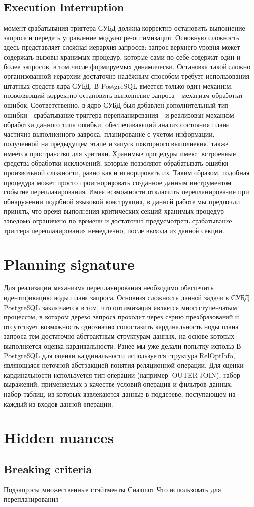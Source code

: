 \documentclass{article}
\begin{document}
\subsection{Execution Interruption}
 момент срабатывания триггера СУБД должна корректно остановить выполнение запроса и передать управление модулю ре-оптимизации. Основную сложность здесь представляет сложная иерархия запросов: запрос верхнего уровня может содержать вызовы хранимых процедур, которые сами по себе содержат один и более запросов, в том числе формируемых динамически. Остановка такой сложно организованной иерархии достаточно надёжным способом требует использования штатных средств ядра СУБД. В PostgreSQL имеется только один механизм, позволяющий корректно остановить выполнение запроса - механизм обработки ошибок. Соответственно, в ядро СУБД был добавлен дополнительный тип ошибки - срабатывание триггера перепланирования - и реализован механизм обработки данного типа ошибки, обеспечивающий анализ состояния плана частично выполненного запроса, планирование с учетом информации, полученной на предыдущем этапе и запуск повторного выполнения.
 также имеется пространство для критики. Хранимые процедуры имеют встроенные средства обработки исключений, которые позволяют обрабатывать ошибки произвольной сложности, равно как и игнорировать их. Таким образом, подобная процедура может просто проигнорировать созданное данным инструментом событие перепланирования. Имея возможности отключить перепланирование при обнаружении подобной языковой конструкции, в данной работе мы предпочли принять, что время выполнения критических секций хранимых процедур заведомо ограничено по времени и достаточно предусмотреть срабатывание триггера перепланирования немедленно, после выхода из данной секции.
\section{Planning signature}
Для реализации механизма перепланирования необходимо обеспечить идентификацию ноды плана запроса. Основная сложность данной задачи в СУБД PostgreSQL заключается в том, что оптимизация является многоступенчатым процессом, в котором дерево запроса проходит через серию преобразований и отсутствует возможность однозначно сопоставить кардинальность ноды плана запроса тем достаточно абстрактным структурам данных, на основе которых выполняется оценка кардинальности.
Ранее мы уже делали попытку использ
В PostgreSQL для оценки кардинальности используется структура RelOptInfo, являющаяся неточной абстракцией понятия реляционной операции. Для оценки кардинальности используется тип операции (например, OUTER JOIN), набор выражений, применяемых в качестве условий операции и фильтров данных, набор таблиц, из которых извлекаются данные в поддереве, поступающем на каждый из входов данной операции.
\section{Hidden nuances}
\subsection{Breaking criteria}
Подзапросы
множественные стэйтменты
Снапшот
Что использовать для перепланирования


\end{document}
